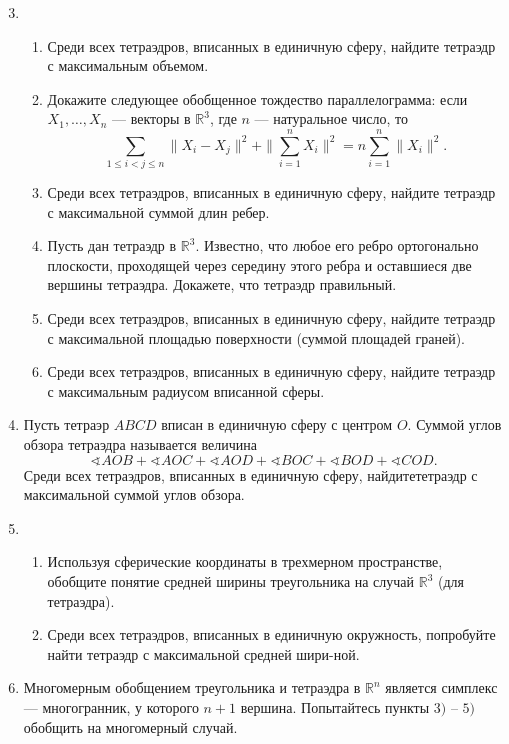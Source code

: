 \begin{enumerate} \setcounter{enumi}{2}
\item
\begin{enumerate}
\item Среди всех тетраэдров, вписанных в единичную сферу, найдите тетраэдр с максимальным объемом.
\item Докажите следующее обобщенное тождество параллелограмма: если $X_1,\dots, X_n$ --- векторы в $\mathbb R^3$, где $n$ --- натуральное число, то
$$
\sum_{1\leq i<j\leq n}\|X_i-X_j\|^2+\|\sum_{i=1}^n X_i\|^2=n\sum_{i=1}^n\| X_i\|^2.
$$
\item Среди всех тетраэдров, вписанных в единичную сферу, найдите тетраэдр с максимальной суммой длин ребер.
\item Пусть дан тетраэдр в $\mathbb R^3$. Известно, что любое его ребро ортогонально плоскости, проходящей через середину этого ребра и оставшиеся две вершины тетраэдра. Докажете, что тетраэдр правильный.
\item Среди всех тетраэдров, вписанных в единичную сферу, найдите тетраэдр  с максимальной площадью поверхности (суммой площадей граней).
\item Среди всех тетраэдров, вписанных в единичную сферу, найдите тетраэдр  с максимальным радиусом вписанной сферы.
\end{enumerate}
\item Пусть тетраэр $ABCD$ вписан в единичную сферу с центром $O$. Суммой углов обзора тетраэдра называется величина
\[
\sphericalangle AOB+\sphericalangle AOC+\sphericalangle AOD+\sphericalangle BOC+\sphericalangle BOD+\sphericalangle COD.
\]
Среди всех тетраэдров, вписанных в единичную сферу, найдите\linebreak  тетраэдр с максимальной суммой углов обзора.
\item
\begin{enumerate}
\item Используя сферические координаты в трехмерном пространстве, обобщите понятие средней ширины треугольника на случай $\mathbb R^3$ (для тетраэдра).
\item Среди всех тетраэдров, вписанных в единичную окружность, попробуйте найти тетраэдр  с максимальной средней шири-\linebreak ной.
\end{enumerate}
\item Многомерным обобщением треугольника и тетраэдра в $\mathbb R^n$ является симплекс --- многогранник, у которого $n+1$ вершина. Попытайтесь пункты $3)$ -- $5)$ обобщить на многомерный случай.
\end{enumerate}

